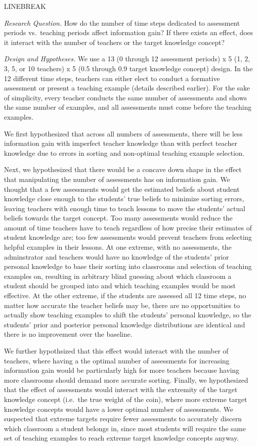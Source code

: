\documentclass[10pt, letterpaper]{apa6}
\begin{document}
LINEBREAK

\emph{Research Question. } How do the number of time steps dedicated to
assessment periods vs.~teaching periods affect information gain? If
there exists an effect, does it interact with the number of teachers or
the target knowledge concept?

\emph{Design and Hypotheses. } We use a 13 (0 through 12 assessment
periods) x 5 (1, 2, 3, 5, or 10 teachers) x 5 (0.5 through 0.9 target
knowledge concept) design. In the 12 different time steps, teachers can
either elect to conduct a formative assessment or present a teaching
example (details described earlier). For the sake of simplicity, every
teacher conducts the same number of assessments and shows the same
number of examples, and all assessments must come before the teaching
examples.

We first hypothesized that across all numbers of assessments, there will
be less information gain with imperfect teacher knowledge than with
perfect teacher knowledge due to errors in sorting and non-optimal
teaching example selection.

Next, we hypothesized that there would be a concave down shape in the
effect that manipulating the number of assessments has on information
gain. We thought that a few assessments would get the estimated beliefs
about student knowledge close enough to the students' true beliefs to
minimize sorting errors, leaving teachers with enough time to teach
lessons to move the students' actual beliefs towards the target concept.
Too many assessments would reduce the amount of time teachers have to
teach regardless of how precise their estimates of student knowledge
are; too few assessments would prevent teachers from selecting helpful
examples in their lessons. At one extreme, with no assessments, the
adminstrator and teachers would have no knowledge of the students' prior
personal knowledge to base their sorting into classrooms and selection
of teaching examples on, resulting in arbitrary blind guessing about
which classroom a student should be grouped into and which teaching
examples would be most effective. At the other extreme, if the students
are assessed all 12 time steps, no matter how accurate the teacher
beliefs may be, there are no opportunities to actually show teaching
examples to shift the students' personal knowledge, so the students'
prior and posterior personal knowledge distributions are identical and
there is no improvement over the baseline.

We further hypothsized that this effect would interact with the number
of teachers, where having a the optimal number of assessments for
increasing information gain would be particularly high for more teachers
because having more classrooms should demand more accurate sorting.
Finally, we hypothesized that the effect of assessments would interact
with the extremity of the target knowledge concept (i.e.~the true weight
of the coin), where more extreme target knowledge concepts would have a
lower optimal number of assessments. We suspected that extreme targets
require fewer assessments to accurately discern which classroom a
student belongs in, since most students will require the same set of
teaching examples to reach extreme target knowledge concepts anyway.
\end{document}
